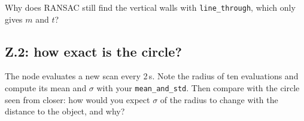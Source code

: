 \documentclass[11pt,a4paper,parskip=half]{scrartcl}
\newcommand{\thema}[1]{\texttt{#1}}
\begin{document}
Why does RANSAC still find the vertical walls with \thema{line\_through}, which only gives \(m\) and \(t\)?

\subsection*{Z.2: how exact is the circle?}
The node evaluates a new scan every 2\,s. Note the radius of ten evaluations and compute its mean and
\(\sigma\) with your \thema{mean\_and\_std}. Then compare with the circle seen from closer: how would you
expect \(\sigma\) of the radius to change with the distance to the object, and why?
\end{document}
